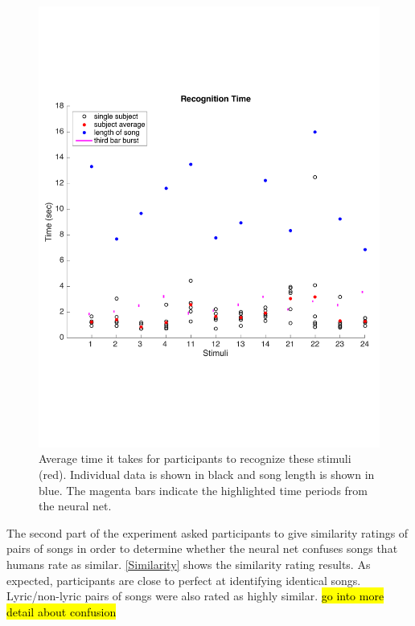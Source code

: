 \begin{figure}[h] 
  \begin{center}
    \includegraphics[width=\textwidth,keepaspectratio=true]{Figures/RecognitionTimeGraph}
    \caption{Average time it takes for participants to recognize these stimuli (red). Individual data is shown in black and song length is shown in blue. The magenta bars indicate the highlighted time periods from the neural net.}
    \label{fig:RecognitionTime}
  \end{center}
\end{figure}

The second part of the experiment asked participants to give similarity ratings of pairs of songs in order to determine whether the neural net confuses songs that humans rate as similar. 
\autoref{Similarity} shows the similarity rating results. 
As expected, participants are close to perfect at identifying identical songs. 
Lyric/non-lyric pairs of songs were also rated as highly similar. 
\hl{go into more detail about confusion}

